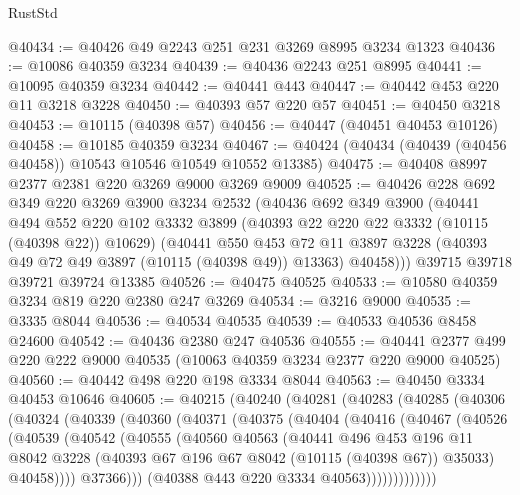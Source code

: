 \begin{lexlean}{RustStd}
\begin{coremodule}
@40434 := @40426 @49 @2243 @251 @231 @3269 @8995 @3234 @1323
@40436 := @10086 @40359 @3234
@40439 := @40436 @2243 @251 @8995
@40441 := @10095 @40359 @3234
@40442 := @40441 @443
@40447 := @40442 @453 @220 @11 @3218 @3228
@40450 := @40393 @57 @220 @57
@40451 := @40450 @3218
@40453 := @10115 (@40398 @57)
@40456 := @40447 (@40451 @40453 @10126)
@40458 := @10185 @40359 @3234
@40467 := @40424 (@40434 (@40439 (@40456 @40458)) @10543 @10546 @10549 @10552 @13385)
@40475 := @40408 @8997 @2377 @2381 @220 @3269 @9000 @3269 @9009
@40525 := @40426
    @228
    @692
    @349
    @220
    @3269
    @3900
    @3234
    @2532
    (@40436
      @692
      @349
      @3900
      (@40441
        @494
        @552
        @220
        @102
        @3332
        @3899
        (@40393 @22 @220 @22 @3332 (@10115 (@40398 @22)) @10629)
        (@40441
          @550
          @453
          @72
          @11
          @3897
          @3228
          (@40393 @49 @72 @49 @3897 (@10115 (@40398 @49)) @13363)
          @40458)))
    @39715
    @39718
    @39721
    @39724
    @13385
@40526 := @40475 @40525
@40533 := @10580 @40359 @3234 @819 @220 @2380 @247 @3269
@40534 := @3216 @9000
@40535 := @3335 @8044
@40536 := @40534 @40535
@40539 := @40533 @40536 @8458 @24600
@40542 := @40436 @2380 @247 @40536
@40555 := @40441 @2377 @499 @220 @222 @9000 @40535 (@10063 @40359 @3234 @2377 @220 @9000 @40525)
@40560 := @40442 @498 @220 @198 @3334 @8044
@40563 := @40450 @3334 @40453 @10646
@40605 := @40215
    (@40240
      (@40281
        (@40283
          (@40285
            (@40306
              (@40324
                (@40339
                  (@40360
                    (@40371
                      (@40375
                        (@40404
                          (@40416
                            (@40467
                              (@40526
                                (@40539
                                  (@40542
                                    (@40555
                                      (@40560
                                        @40563
                                        (@40441
                                          @496
                                          @453
                                          @196
                                          @11
                                          @8042
                                          @3228
                                          (@40393 @67 @196 @67 @8042 (@10115 (@40398 @67)) @35033)
                                          @40458))))
                                  @37366)))
                            (@40388 @443 @220 @3334 @40563)))))))))))))

\end{coremodule}
\end{lexlean}
